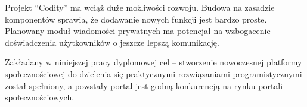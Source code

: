 \documentclass[a4paper,12pt,polish,twoside]{extreport}
\begin{document}
Projekt ``Codity'' ma wciąż duże możliwości rozwoju.
Budowa na zasadzie komponentów sprawia, że dodawanie nowych funkcji jest bardzo proste. Planowany moduł wiadomości prywatnych ma potencjał na wzbogacenie doświadczenia użytkowników o jeszcze lepszą komunikację.

Zakładany w niniejszej pracy dyplomowej cel -- stworzenie nowoczesnej platformy społecznościowej do dzielenia się praktycznymi rozwiązaniami programistycznymi został spełniony, a powstały portal jest godną konkurencją na rynku portali społecznościowych.

\newpage
\listoffigures

\newpage
\listofcodes

\newpage
\printbibliography[heading=bibintoc,title={Bibliografia}]
\end{document}
